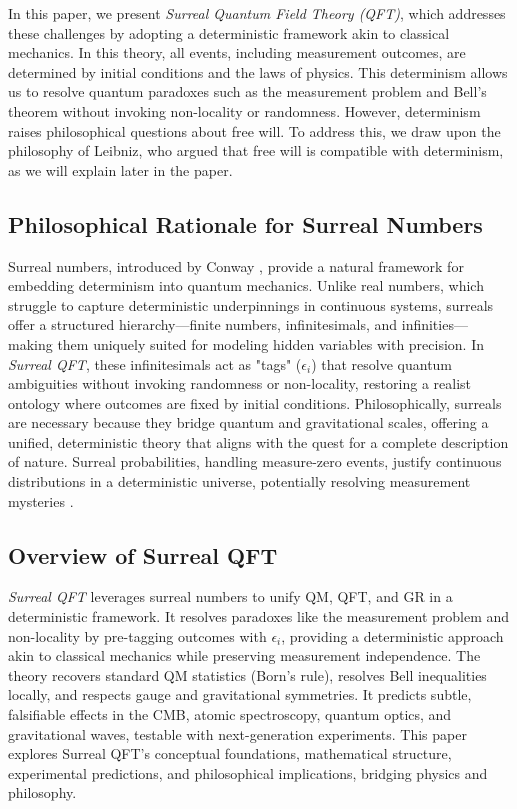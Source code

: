 \documentclass{article}
\begin{document}
In this paper, we present \textit{Surreal Quantum Field Theory (QFT)}, which addresses these challenges by adopting a deterministic framework akin to classical mechanics. In this theory, all events, including measurement outcomes, are determined by initial conditions and the laws of physics. This determinism allows us to resolve quantum paradoxes such as the measurement problem and Bell's theorem without invoking non-locality or randomness. However, determinism raises philosophical questions about free will. To address this, we draw upon the philosophy of Leibniz, who argued that free will is compatible with determinism, as we will explain later in the paper.

\subsection{Philosophical Rationale for Surreal Numbers}
Surreal numbers, introduced by Conway \cite{Conway1976}, provide a natural framework for embedding determinism into quantum mechanics. Unlike real numbers, which struggle to capture deterministic underpinnings in continuous systems, surreals offer a structured hierarchy---finite numbers, infinitesimals, and infinities---making them uniquely suited for modeling hidden variables with precision. In \textit{Surreal QFT}, these infinitesimals act as "tags" (\(\epsilon_i\)) that resolve quantum ambiguities without invoking randomness or non-locality, restoring a realist ontology where outcomes are fixed by initial conditions. Philosophically, surreals are necessary because they bridge quantum and gravitational scales, offering a unified, deterministic theory that aligns with the quest for a complete description of nature. Surreal probabilities, handling measure-zero events, justify continuous distributions in a deterministic universe, potentially resolving measurement mysteries \cite{Pruss2010}.

\subsection{Overview of Surreal QFT}
\textit{Surreal QFT} leverages surreal numbers to unify QM, QFT, and GR in a deterministic framework. It resolves paradoxes like the measurement problem and non-locality by pre-tagging outcomes with \(\epsilon_i\), providing a deterministic approach akin to classical mechanics while preserving measurement independence. The theory recovers standard QM statistics (Born's rule), resolves Bell inequalities locally, and respects gauge and gravitational symmetries. It predicts subtle, falsifiable effects in the CMB, atomic spectroscopy, quantum optics, and gravitational waves, testable with next-generation experiments. This paper explores Surreal QFT's conceptual foundations, mathematical structure, experimental predictions, and philosophical implications, bridging physics and philosophy.
\end{document}
